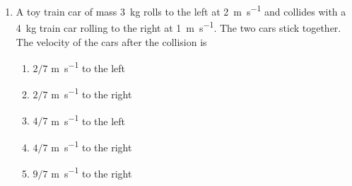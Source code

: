 \documentclass{../../oss-apphys}
\begin{document}
\genheader


\genmultidirections

\gengravity

\raggedcolumns
\begin{multicols}{2}

  \begin{enumerate}[leftmargin=18pt]

  \item A toy train car of mass \SI{3}{\kilo\gram} rolls to the left at
    \SI{2}{\metre\per\second} and collides with a \SI{4}{\kilo\gram} train
    car rolling to the right at \SI{1}{\metre\per\second}. The two cars stick
    together. The velocity of the cars after the collision is
    \begin{enumerate}[noitemsep,topsep=0pt,leftmargin=18pt,label=(\Alph*)]
    \item $2/7$ \si{\metre\per\second} to the left
    \item $2/7$ \si{\metre\per\second} to the right
    \item $4/7$ \si{\metre\per\second} to the left
    \item $4/7$ \si{\metre\per\second} to the right
    \item $9/7$ \si{\metre\per\second} to the right
    \end{enumerate}
    

\end{enumerate}
\end{multicols}
\end{document}
